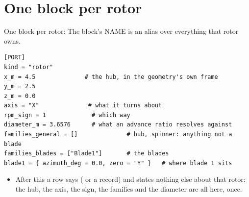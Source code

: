 %
\section{One block per rotor}

\begin{frame}[fragile]{One block per rotor: }
\small The block's NAME is an alias over everything that rotor owns.
\begin{lstlisting}[basicstyle=\ttfamily\scriptsize,numbers=none]
[PORT]
kind = "rotor"
x_m = 4.5              # the hub, in the geometry's own frame
y_m = 2.5
z_m = 0.0
axis = "X"              # what it turns about
rpm_sign = 1             # which way
diameter_m = 3.6576      # what an advance ratio resolves against
families_general = []              # hub, spinner: anything not a blade
families_blades = ["Blade1"]       # the blades
blade1 = { azimuth_deg = 0.0, zero = "Y" }   # where blade 1 sits
\end{lstlisting}
\begin{itemize}\small
  \item After this a row says  ( or a
         record) and states nothing else about that rotor:
        the hub, the axis, the sign, the families and the diameter are all
        here, once.
\end{itemize}
\end{frame}

